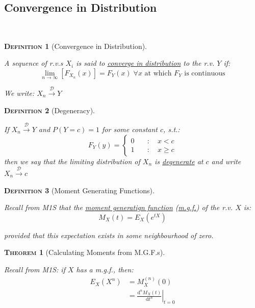 \documentclass[12pt,a4paper]{article}
\newtheorem{definition}{\textsc{Definition}}[section]
\newtheorem{theorem}{\textsc{Theorem}}[section]
\newcommand{\diff}{\mathrm{d}}
\begin{document}
\subsection{Convergence in Distribution}$\;$

\begin{definition}[Convergence in Distribution]$\;$\par\vspace{1cm}

A sequence of r.v.s $X_i$ is said to \underline{converge in distribution} to the r.v. $Y$ if:
$$\lim_{n\to\infty}\left[F_{X_n}(x)\right] = F_Y(x) \;\mbox{$\forall x$ at which $F_Y$ is continuous}$$

We write: $X_n \xrightarrow{\mathscr{D}}Y$

\end{definition}

\begin{definition}[Degeneracy]$\;$\par\vspace{1cm}

If $X_n \xrightarrow{\mathscr{D}} Y$ and $P(Y=c) = 1$ for some constant $c$, s.t.:
$$F_Y(y) = \left\{\begin{array}{cc} 0\quad &:\quad x<c\\ 1\quad&:\quad x\geq c \end{array}\right.$$
then we say that the limiting distribution of $X_n$ is \underline{degenerate} at $c$ and write $X_n \xrightarrow{\mathscr{D}} c$

\end{definition}

\begin{definition}[Moment Generating Functions]$\;$\par\vspace{1cm}

Recall from M1S that the \underline{moment generatign function} (\underline{m.g.f.}) of the r.v. $X$ is:
$$M_X(t) = E_X(e^{tX})$$

provided that this expectation exists in some neighbourhood of zero.

\end{definition}

\begin{theorem}[Calculating Moments from M.G.F.s]$\;$\par\vspace{1cm}

Recall from M1S: if $X$ has a m.g.f., then:
\begin{align*}
E_X(X^n) &= M_X^{(n)}(0)\\
&= \left.\frac{\diff^n M_X(t)}{\diff t^n}\right|_{t=0}
\end{align*}

\end{theorem}
\end{document}
